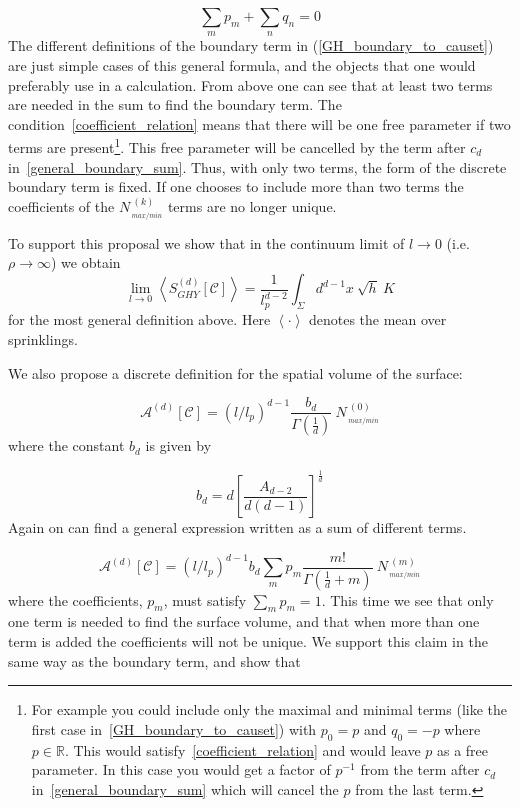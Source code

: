 \documentclass[12pt]{article}
\newcommand{\be}{\begin{equation}}
\newcommand{\ee}{\end{equation}}
\begin{document}
\be\label{coefficient_relation}
\sum_m p_m + \sum_n q_n = 0
\ee
The different definitions of the boundary term in (\ref{GH_boundary_to_causet}) are just simple cases of this general formula, and the objects that one would preferably use in a calculation. From above one can see that at least two terms are needed in the sum to find the boundary term. The condition~\eqref{coefficient_relation} means that there will be one free parameter if two terms are present\footnote{For example you could include only the maximal and minimal terms (like the first case in~\eqref{GH_boundary_to_causet}) with $p_0=p$ and $q_0=-p$ where $p\in\mathbb{R}$. This would satisfy~\eqref{coefficient_relation} and would leave $p$ as a free parameter. In this case you would get a factor of $p^{-1}$ from the term after $c_d$ in~\eqref{general_boundary_sum} which will cancel the $p$ from the last term.}. This free parameter will be cancelled by the term after $c_d$ in~\eqref{general_boundary_sum}. Thus, with only two terms, the form of the discrete boundary term is fixed. If one chooses to include more than two terms the coefficients of the $N_{{\,}_{max/min}}^{\:(k)}$ terms are no longer unique.

To support this proposal we show that in the continuum limit of $l\rightarrow 0$ (i.e. $\rho\rightarrow\infty$) we obtain
\be
\lim_{l\rightarrow0}\left\langle S^{(d)}_{GHY}[\mathcal C] \right\rangle= \frac{1}{l_p^{d-2}}\int_{\Sigma} d^{d-1}x\: \sqrt{h}\: K\label{eq:mainconjecture}
\ee
for the most general definition above. Here $\left\langle\cdot\right\rangle$ denotes the mean over sprinklings.

We also propose a discrete definition for the spatial volume of the surface:

\be\label{eq:surface_volume}
\mathcal{A}^{(d)}[\mathcal{C}]=\left(l/l_p\right)^{d-1}\frac{b_{d}}{\Gamma\left(\frac{1}{d}\right)}\: N_{{\,}_{max/min}}^{\:(0)}
\ee
where the constant $b_d$ is given by

\be\label{constant_b_d}
b_d=d\left[\frac{A_{d-2}}{d(d-1)}\right]^{\frac{1}{d}}
\ee
Again on can find a general expression written as a sum of different terms.

\be\label{general_area_sum}
\mathcal{A}^{(d)}[\mathcal{C}]=\left(l/l_p\right)^{d-1}b_{d}\sum_m p_m \frac{m!}{\Gamma\left(\frac{1}{d}+m \right)}\: N_{{\,}_{max/min}}^{\:(m)}
\ee
where the coefficients, $p_m$, must satisfy $\sum_m p_m =1$. This time we see that only one term is needed to find the surface volume, and that when more than one term is added the coefficients will not be unique. We support this claim in the same way as the boundary term, and show that
\end{document}
